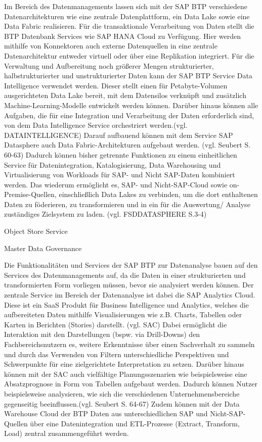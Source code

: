 Im Bereich des Datenmanagements lassen sich mit der SAP BTP verschiedene Datenarchitekturen wie eine zentrale Datenplattform, ein Data Lake sowie eine Data Fabric realisieren. Für die transaktionale Verarbeitung von Daten stellt die BTP Datenbank Services wie SAP HANA Cloud zu Verfügung. Hier werden mithilfe von Konnektoren auch externe Datenquellen in eine zentrale Datenarchitektur entweder virtuell oder über eine Replikation integriert. Für die Verwaltung und Aufbereitung noch größerer Mengen strukturierter, halbstrukturierter und unstrukturierter Daten kann der SAP BTP Service Data Intelligence verwendet werden. Dieser stellt einen für Petabyte-Volumen ausgerichteten Data Lake bereit, mit dem Datensilos verknüpft und zusätzlich Machine-Learning-Modelle entwickelt werden können. Darüber hinaus können alle Aufgaben, die für eine Integration und Verarbeitung der Daten erforderlich sind, von dem Data Intelligence Service orchestriert werden.(vgl. DATAINTELLIGENCE) Darauf aufbauend können mit dem Service SAP Datasphere auch Data Fabric-Architekturen aufgebaut werden. (vgl. Seubert S. 60-63) Dadurch können bisher getrennte Funktionen zu einem einheitlichen Service für Datenintegration, Katalogisierung, Data Warehousing und Virtualisierung von Workloads für SAP- und Nicht SAP-Daten kombiniert werden. Das wiederum ermöglicht es, SAP- und Nicht-SAP-Cloud sowie on-Premise-Quellen, einschließlich Data Lakes zu verbinden, um die dort enthaltenen Daten zu föderieren, zu transformieren und in ein für die Auswertung/ Analyse zuständiges Zielsystem zu laden. (vgl. FSDDATASPHERE S.3-4) 

Object Store Service

Master Data Governance

Die Funktionalitäten und Services der SAP BTP zur Datenanalyse bauen auf den Services des Datenmanagements auf, da die Daten in einer strukturierten und transformierten Form vorliegen müssen, bevor sie analysiert werden können. Der zentrale Service im Bereich der Datenanalyse ist dabei die SAP Analytics Cloud. Diese ist ein SaaS Produkt für Business Intelligence und Analytics, welches die aufbereiteten Daten mithilfe Visualisierungen wie z.B. Charts, Tabellen oder Karten in Berichten (Stories) darstellt. (vgl. SAC) Dabei ermöglicht die Interaktion mit den Darstellungen (bspw. via Drill-Downs) den Fachbereichsnutzern es, weitere Erkenntnisse über einen Sachverhalt zu sammeln und durch das Verwenden von Filtern unterschiedliche Perspektiven und Schwerpunkte für eine zielgerichtete Interpretation zu setzen. Darüber hinaus können mit der SAC auch vielfältige Planungsszenarien wie beispielsweise eine Absatzprognose in Form von Tabellen aufgebaut werden. Dadurch können Nutzer beispielsweise analysieren, wie sich die verschiedenen Unternehmensbereiche gegenseitig beeinflussen.(vgl. Seubert S. 64-67)
Zudem können mit der Data Warehouse Cloud der BTP  Daten aus unterschiedlichen SAP und Nicht-SAP-Quellen über eine Datenintegration und ETL-Prozesse (Extract, Transform, Load) zentral zusammengeführt werden.

